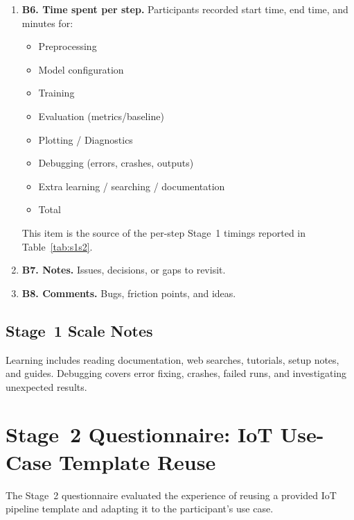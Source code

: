 \begin{enumerate}[leftmargin=*]
    \item \textbf{B6. Time spent per step.}
    Participants recorded start time, end time, and minutes for:
    \begin{itemize}
        \item Preprocessing
        \item Model configuration
        \item Training
        \item Evaluation (metrics/baseline)
        \item Plotting / Diagnostics
        \item Debugging (errors, crashes, outputs)
        \item Extra learning / searching / documentation
        \item Total
    \end{itemize}
    This item is the source of the per-step Stage~1 timings reported in Table~\ref{tab:s1s2}.

    \item \textbf{B7. Notes.}
    Issues, decisions, or gaps to revisit.

    \item \textbf{B8. Comments.}
    Bugs, friction points, and ideas.
\end{enumerate}

\subsection{Stage~1 Scale Notes}
\label{app:stage1_scale_notes}

Learning includes reading documentation, web searches, tutorials, setup notes, and guides. Debugging covers error fixing, crashes, failed runs, and investigating unexpected results.

\section{Stage~2 Questionnaire: IoT Use-Case Template Reuse}
\label{app:stage2_questionnaire}

The Stage~2 questionnaire evaluated the experience of reusing a provided IoT pipeline template and adapting it to the participant's use case.

